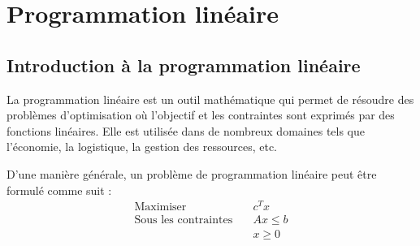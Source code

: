 \documentclass[a4paper]{article}
\begin{document}
\section{Programmation linéaire}
\label{sec:pl}

\subsection{Introduction à la programmation linéaire}
La programmation linéaire est un outil mathématique qui permet de résoudre des problèmes d'optimisation où l'objectif et les contraintes sont exprimés par des fonctions linéaires.
Elle est utilisée dans de nombreux domaines tels que l'économie, la logistique, la gestion des ressources, etc.

D'une manière générale, un problème de programmation linéaire peut être formulé comme suit :
\begin{align*}
	\text{Maximiser} \quad & c^T x \\
	\text{Sous les contraintes} \quad
	& Ax \leq b \\
	& x \geq 0
\end{align*}
\end{document}

